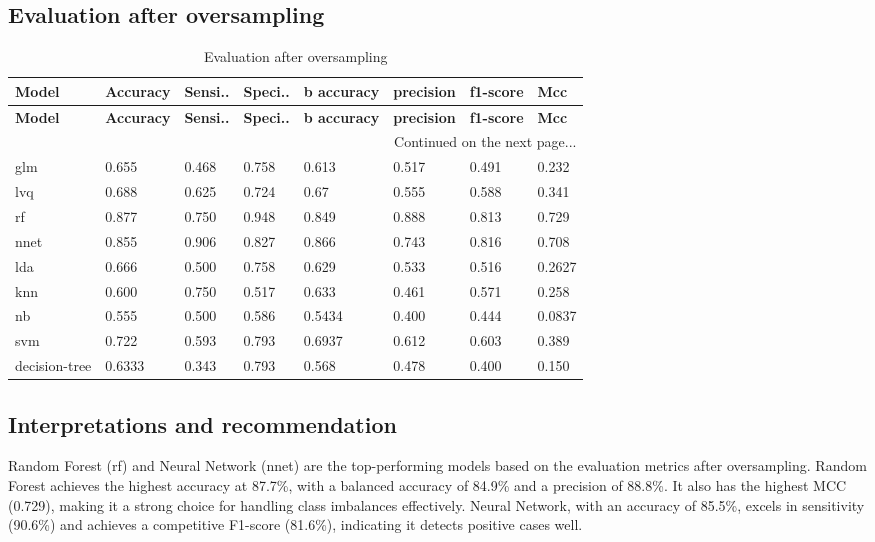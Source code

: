 \documentclass[12pt,a4paper]{article}
\begin{document}
  \subsection{Evaluation after oversampling}
  \begin{longtable}{llllllll}
  	\caption{Evaluation after oversampling} \\
  	\toprule
  	\textbf{Model} & \textbf{Accuracy} & \textbf{Sensi..} & \textbf{Speci..} & \textbf{b accuracy} & \textbf{precision} & \textbf{f1-score} & \textbf{Mcc} \\ 
  	\midrule
  	\endfirsthead
  	
  	\toprule
  	\textbf{Model} & \textbf{Accuracy} & \textbf{Sensi..} & \textbf{Speci..} & \textbf{b accuracy} & \textbf{precision} & \textbf{f1-score} & \textbf{Mcc} \\ 
  	\midrule
  	\endhead
  	
  	\midrule
  	\multicolumn{8}{r}{Continued on the next page...} \\
  	\midrule
  	\endfoot
  	
  	\bottomrule
  	\endlastfoot
  	
  	glm&	0.655	&0.468 &0.758 &0.613	&0.517	&0.491	&0.232\\	
  	lvq&	0.688	&0.625	&0.724	&0.67	&0.555	&0.588	&0.341\\	
  	\rowcolor{lightgreen}rf&	0.877	&0.750	&0.948		&0.849	&0.888	&0.813	&0.729\\	
  	\rowcolor{lightgreen}nnet&	0.855	&0.906	&0.827 &0.866	&0.743	&0.816	&0.708\\	
  	 lda&	0.666	&0.500	&0.758 &0.629	&0.533	&0.516	&0.2627\\	
  	knn&	0.600	&0.750	&0.517 &0.633	&0.461	&0.571	&0.258\\	
  	nb&	0.555	&0.500	&0.586 &0.5434	&0.400	&0.444	&0.0837\\	
  	\rowcolor{lightgreen}svm &	0.722	&0.593	&0.793 &0.6937	&0.612	&0.603	&0.389\\	
  	decision-tree	& 0.6333 &0.343 &0.793 &0.568	&0.478	&0.400	&0.150\\
  	
  \end{longtable}

	\subsection{Interpretations and recommendation}
	Random Forest (rf) and Neural Network (nnet) are the top-performing models based on the evaluation metrics after oversampling. Random Forest achieves the highest accuracy at 87.7\%, with a balanced accuracy of 84.9\% and a precision of 88.8\%. It also has the highest MCC (0.729), making it a strong choice for handling class imbalances effectively. Neural Network, with an accuracy of 85.5\%, excels in sensitivity (90.6\%) and achieves a competitive F1-score (81.6\%), indicating it detects positive cases well.
	
\end{document}
